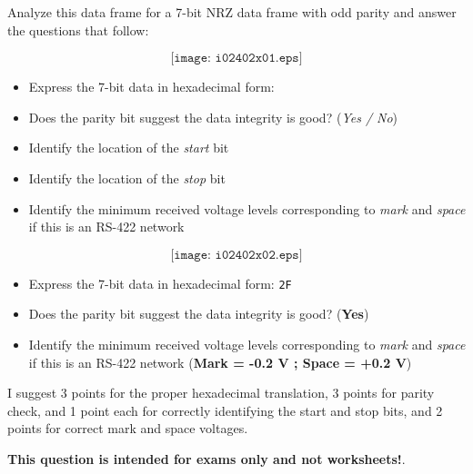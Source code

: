 

Analyze this data frame for a 7-bit NRZ data frame with odd parity and answer the questions that follow:

$$\texttt{[image: i02402x01.eps]}$$

\begin{itemize}
\item{} Express the 7-bit data in hexadecimal form: \underbar{\hskip 50pt}
\vskip 5pt
\item{} Does the parity bit suggest the data integrity is good? ({\it Yes / No})
\vskip 5pt
\item{} Identify the location of the {\it start} bit
\vskip 5pt
\item{} Identify the location of the {\it stop} bit
\vskip 5pt
\item{} Identify the minimum received voltage levels corresponding to {\it mark} and {\it space} if this is an RS-422 network
\end{itemize}







$$\texttt{[image: i02402x02.eps]}$$

\begin{itemize}
\item{} Express the 7-bit data in hexadecimal form: {\tt 2F}
\vskip 5pt
\item{} Does the parity bit suggest the data integrity is good? ({\bf Yes})
\vskip 5pt
\item{} Identify the minimum received voltage levels corresponding to {\it mark} and {\it space} if this is an RS-422 network ({\bf Mark = -0.2 V ; Space = +0.2 V})
\end{itemize}

I suggest 3 points for the proper hexadecimal translation, 3 points for parity check, and 1 point each for correctly identifying the start and stop bits, and 2 points for correct mark and space voltages.







{\bf This question is intended for exams only and not worksheets!}.



